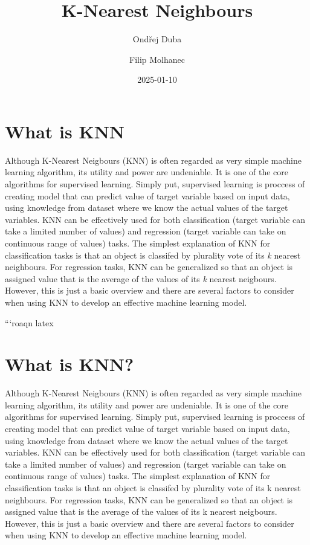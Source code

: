 \documentclass[
  letterpaper,
  DIV=11,
  numbers=noendperiod]{scrartcl}
\title{K-Nearest Neighbours}
\author{Ondřej Duba \and Filip Molhanec}
\date{2025-01-10}
\begin{document}
\maketitle


\section{What is KNN}\label{what-is-knn}

Although K-Nearest Neigbours (KNN) is often regarded as very simple
machine learning algorithm, its utility and power are undeniable. It is
one of the core algorithms for supervised learning. Simply put,
supervised learning is proccess of creating model that can predict value
of target variable based on input data, using knowledge from dataset
where we know the actual values of the target variables. KNN can be
effectively used for both classification (target variable can take a
limited number of values) and regression (target variable can take on
continuous range of values) tasks. The simplest explanation of KNN for
classification tasks is that an object is classifed by plurality vote of
its \emph{k} nearest neighbours. For regression tasks, KNN can be
generalized so that an object is assigned value that is the average of
the values of its \emph{k} nearest neigbours. However, this is just a
basic overview and there are several factors to consider when using KNN
to develop an effective machine learning model.

```roaqn latex

\section{What is KNN?}

Although K-Nearest Neigbours (KNN) is often regarded as very simple
machine learning algorithm, its utility and power are undeniable. It is
one of the core algorithms for supervised learning. Simply put,
supervised learning is proccess of creating model that can predict value
of target variable based on input data, using knowledge from dataset
where we know the actual values of the target variables. KNN can be
effectively used for both classification (target variable can take a
limited number of values) and regression (target variable can take on
continuous range of values) tasks. The simplest explanation of KNN for
classification tasks is that an object is classifed by plurality vote of
its k nearest neighbours. For regression tasks, KNN can be generalized
so that an object is assigned value that is the average of the values of
its k nearest neigbours. However, this is just a basic overview and
there are several factors to consider when using KNN to develop an
effective machine learning model.
\end{document}
